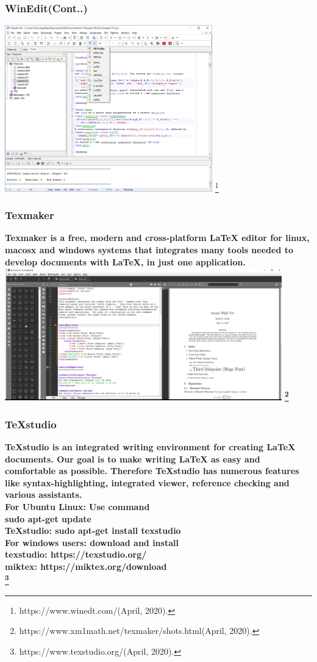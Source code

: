 \documentclass{beamer}
\begin{document}
	\begin{frame}		
\frametitle{\bf WinEdit(Cont..)}
\centering
\includegraphics[width=9cm]{WE}
\footnote{https://www.winedt.com/(April, 2020).}	
\end{frame}



\begin{frame}		
\frametitle{\bf Texmaker}
\bf 	\color{red} Texmaker 	\color{blue}is a free, modern and cross-platform LaTeX editor
for linux, macosx and windows systems that integrates many
tools needed to develop documents with LaTeX, in just one
application.
\includegraphics[width=12cm]{Te}
\footnote{https://www.xm1math.net/texmaker/shots.html(April, 2020).}	
\end{frame}





\begin{frame}		
\frametitle{\bf TeXstudio}
\bf 	\color{red} TeXstudio 	\color{blue} is an integrated writing environment for creating LaTeX documents. Our goal is to make writing LaTeX as easy and comfortable as possible. Therefore TeXstudio has numerous features like syntax-highlighting, integrated viewer, reference checking and various assistants. \\
\color{red}
For Ubuntu Linux: \color{blue} Use command\\
sudo apt-get update\\
\color{red}TeXstudio:\color{blue} sudo apt-get install texstudio\\

\color{red}For windows users: \color{blue} download and install\\
\color{red}texstudio: \color{blue} https://texstudio.org/\\
\color{red}miktex:  \color{blue} https://miktex.org/download\\
\footnote{https://www.texstudio.org/(April, 2020).}	
\end{frame}
\end{document}
